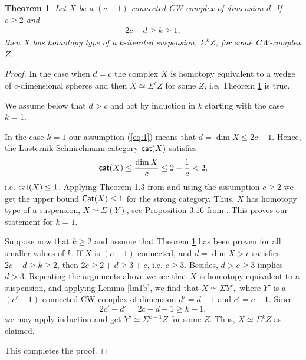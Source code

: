 \documentclass[11pt,twoside, reqno]{amsart}
\theoremstyle{plain}
\newtheorem{teo}[lema]{Theorem}
\theoremstyle{definition}
\newcommand{\cat}{{\sf{cat}}}
\newcommand{\Cat}{{\sf{Cat}}}
\begin{document}
\begin{teo}\label{thmb}
Let $X$ be a $(c-1)$-connected CW-complex of dimension $d$. If $c\ge 2$ and 
\begin{eqnarray}\label{eq:1}
2c-d\ge k\ge 1,
\end{eqnarray} 
then $X$ has homotopy type of a $k$-iterated suspension,
$\Sigma^k Z$, for some CW-complex $Z$. 
\end{teo}
\begin{proof}  In the case when $d=c$ the complex $X$ is homotopy equivalent to a wedge of $c$-dimensional spheres and then $X\simeq \Sigma^c Z$ for some $Z$, i.e. Theorem \ref{thmb} is true.  

We assume below that $d>c$ and act by induction in $k$ starting with the case $k=1$. 

In the case $k=1$ our assumption (\ref{eq:1}) means that $d=\dim X \le 2c-1$. 
Hence, the Lusternik-Schnirelmann category $\cat(X)$ satisfies 
$$
\cat(X)\le \frac{\dim X}{c} \le 2-\frac{1}{c}<2,
$$
i.e. $\cat(X)\le 1$. Applying Theorem 1.3 from \cite{Ganea} and using the assumption $c\ge 2$ we get the upper bound $\Cat(X)\le 1$ for the strong category. 
Thus, $X$ has homotopy type of a suspension, $X\simeq \Sigma (Y)$, see Proposition 3.16 from \cite{CLOT}. 
This proves our statement for $k=1$. 

Suppose now that $k\ge 2$ and assume that Theorem \ref{thmb} has been proven for all smaller values of $k$. If $X$ is $(c-1)$-connected, and $d=\dim X > c$ satisfies
$2c-d\ge k\ge 2$, then $2c \ge 2+d\ge 3+c$, i.e. $c\ge 3$. Besides, $d>c\ge 3$ implies $d>3$. 
Repeating the arguments above we see that $X$ is homotopy equivalent to a suspension, and 
applying Lemma \ref{lm1b}, we find that $X\simeq \Sigma Y',$ where $Y'$ is a $(c'-1)$-connected CW-complex of dimension $d'=d-1$ and $c'=c-1$. 
Since 
$$
2c'-d'=2c-d-1\ge k-1,
$$
we may apply induction and get $Y'\simeq \Sigma^{k-1}Z$ for some $Z$. Thus, $X\simeq \Sigma^kZ$ as claimed. 

This completes the proof. 
\end{proof}


%
%
%
%
\end{document}
